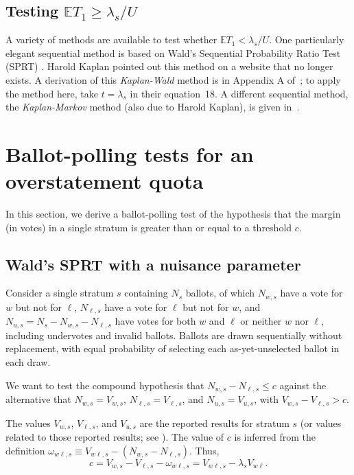 \documentclass[runningheads]{llncs}
\begin{document}
\subsection{Testing $\mathbb{E} T_1 \ge \lambda_s/U$}

A variety of methods are available to test whether $\mathbb{E} T_1 < \lambda_s/U$.
One particularly elegant sequential method is based on Wald's Sequential Probability
Ratio Test (SPRT) \cite{wald45}.
Harold Kaplan pointed out this method on a website that no longer exists.
A derivation of this \emph{Kaplan-Wald} method is in Appendix A of~\cite{starkTeague14};
to apply the method here, take $t = \lambda_s$ in their equation~18.
A different sequential method, the \emph{Kaplan-Markov} method (also due to Harold Kaplan), 
is given in~\cite{stark09b}.


\section{Ballot-polling tests for an overstatement quota}\label{sec:appendix-polling}
In this section, we derive a ballot-polling test of the hypothesis that the margin (in votes) in a single stratum is greater than or equal to a threshold $c$. 

\subsection{Wald's SPRT with a nuisance parameter}

Consider a single stratum $s$ containing $N_s$ ballots, of which 
$N_{w,s}$ have a vote for $w$ but not for $\ell$, $N_{\ell,s}$ have a vote for $\ell$ but not for $w$, and $N_{u,s} = N_s - N_{w,s} - N_{\ell,s}$ have votes for both $w$ and $\ell$ or neither $w$ nor $\ell$, including undervotes and invalid ballots.
Ballots are drawn sequentially without replacement, with equal probability of selecting each as-yet-unselected ballot in each draw.

We want to test the compound hypothesis that $N_{w,s} - N_{\ell,s} \le c$ against the alternative that $N_{w,s} = V_{w,s}$, $N_{\ell,s} = V_{\ell,s}$, and $N_{u,s} = V_{u,s}$, with $V_{w,s} - V_{\ell,s} > c$.

The values $V_{w,s}$, $V_{\ell,s}$, and $V_{u,s}$ are the reported results for stratum $s$ 
(or values related to those reported results; see \cite{lindemanEtal12}). 
The value of $c$ is inferred from the definition $\omega_{w\ell, s} \equiv V_{w\ell, s} - (N_{w,s} - N_{\ell,s})$.
Thus,
$$ c = V_{w, s} - V_{\ell, s} - \omega_{w\ell, s} = V_{w\ell, s} - \lambda_s V_{w\ell}.$$
\end{document}
